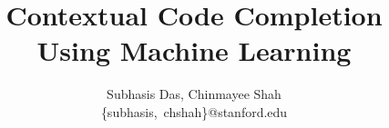 \documentclass[10pt,twocolumn]{article}
\begin{document}
\leading{12pt}

\title{\bf Contextual Code Completion Using Machine Learning}
\author{Subhasis Das, Chinmayee Shah\\
        \{subhasis,~chshah\}@stanford.edu}

\date{}
\maketitle
\thispagestyle{empty}




% 




 
\end{document}

